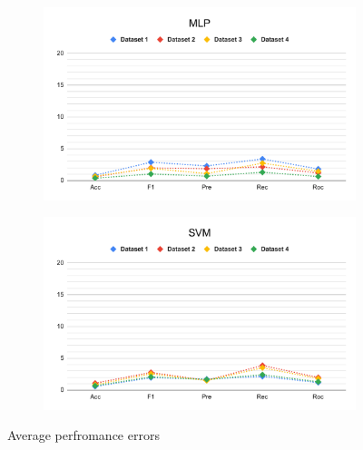 \begin{figure}
  \ContinuedFloat
  \begin{subfigure}{.9\columnwidth}
    \centering
    \includegraphics[width=0.9\columnwidth]{media/data/performance_delta/delta_MLP.pdf}
    \caption{}
    \label{fig:perfromance_delta_mlp}
  \end{subfigure}%
\end{figure}

\begin{figure}
  \ContinuedFloat
  \begin{subfigure}{.9\columnwidth}
    \centering
    \includegraphics[width=0.9\columnwidth]{media/data/performance_delta/delta_SVM.pdf}
    \caption{}
    \label{fig:perfromance_delta_svm}
  \end{subfigure}
  \caption{Average perfromance errors}
  \label{fig:perfromance_delta}
\end{figure}


